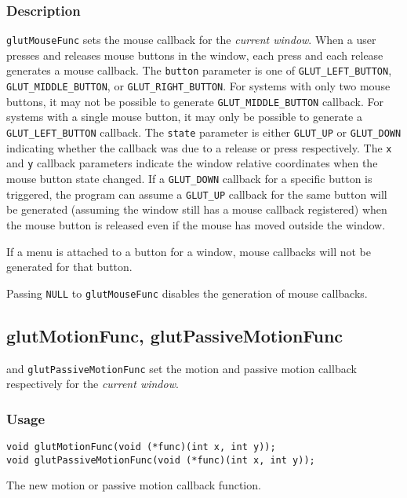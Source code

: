 \subsubsection*{Description}

{\tt glutMouseFunc} sets the mouse callback for the {\em current window}.
When a user presses and releases mouse buttons in the window, each press
and each release generates a mouse callback.  The {\tt button} parameter
is one of {\tt GLUT\_LEFT\_BUTTON}, {\tt GLUT\_MIDDLE\_BUTTON}, or
{\tt GLUT\_RIGHT\_BUTTON}.  For systems with only two mouse buttons, it may
not be possible to generate {\tt GLUT\_MIDDLE\_BUTTON} callback.  For systems
with a single mouse button, it may only be possible to generate a
{\tt GLUT\_LEFT\_BUTTON} callback.  The {\tt state} parameter is either
{\tt GLUT\_UP} or {\tt GLUT\_DOWN} indicating whether the callback
was due to a release or press respectively.  The {\tt x} and {\tt y} callback
parameters indicate the window relative coordinates when the mouse
button state changed.  If a {\tt GLUT\_DOWN} callback for a specific
button is triggered, the program can assume a {\tt GLUT\_UP} callback for the 
same button will be generated (assuming the window still has a mouse
callback registered) when the mouse button is released even if
the mouse has moved outside the window.

If a menu is attached to a button for a window, mouse callbacks will
not be generated for that button.

Passing {\tt NULL} to {\tt glutMouseFunc} disables
the generation of mouse callbacks.

\subsection{glutMotionFunc, glutPassiveMotionFunc}

 and {\tt glutPassiveMotionFunc} set the motion and
passive motion callback respectively for the {\em current window}.

\subsubsection*{Usage}
\begin{verbatim}
void glutMotionFunc(void (*func)(int x, int y));
void glutPassiveMotionFunc(void (*func)(int x, int y));
\end{verbatim}
\begin{description}
\itemsep 0in
\item[\tt func]
The new motion or passive motion callback function.
\end{description}

